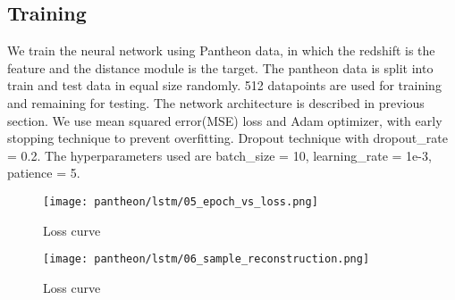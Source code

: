 \subsection{Training}
We train the neural network using Pantheon data, in which the redshift is the feature and the distance module is the target. The pantheon data is split into train and test data in equal size randomly. 512 datapoints are used for training and remaining for testing. The network architecture is described in previous section. We use mean squared error(MSE) loss and Adam\cite{kingma2014adam} optimizer, with early stopping technique to prevent overfitting. Dropout technique with dropout\_rate = 0.2. The hyperparameters used are batch\_size = 10, learning\_rate = 1e-3, patience = 5.
\begin{figure}[H]
	\centering
	\texttt{[image: pantheon/lstm/05\_epoch\_vs\_loss.png]}
	\caption{Loss curve}
	\label{fig:loss_curve}
\end{figure}
\begin{figure}[H]
	\centering
	\texttt{[image: pantheon/lstm/06\_sample\_reconstruction.png]}
	\caption{Loss curve}
	\label{fig:reconstruction}
\end{figure}